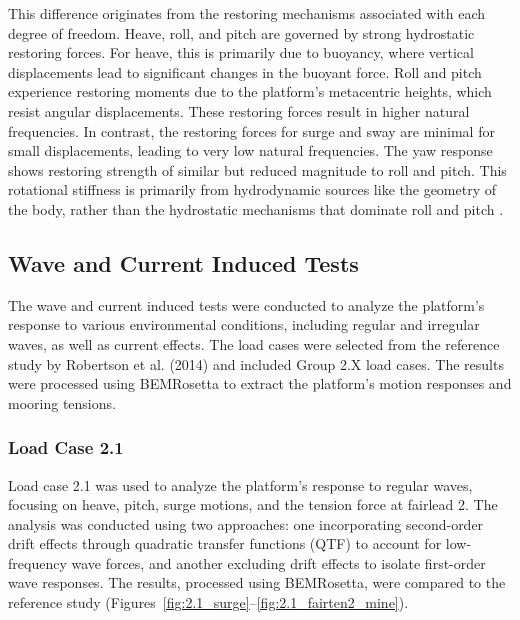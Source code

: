 \documentclass[a4paper, 11pt]{article}
\begin{document}
This difference originates from the restoring mechanisms associated with each degree of freedom. Heave, roll, and pitch are governed by strong hydrostatic restoring forces. For heave, this is primarily due to buoyancy, where vertical displacements lead to significant changes in the buoyant force. Roll and pitch experience restoring moments due to the platform's metacentric heights, which resist angular displacements. These restoring forces result in higher natural frequencies. In contrast, the restoring forces for surge and sway are minimal for small displacements, leading to very low natural frequencies. The yaw response shows restoring strength of similar but reduced magnitude to roll and pitch. This rotational stiffness is primarily from hydrodynamic sources like the geometry of the body, rather than the hydrostatic mechanisms that dominate roll and pitch \cite{metacenter}.


\subsection{Wave and Current Induced Tests}
\hspace*{0.5cm}The wave and current induced tests were conducted to analyze the platform's response to various environmental conditions, including regular and irregular waves, as well as current effects. The load cases were selected from the reference study by Robertson et al. (2014) and included Group 2.X load cases. The results were processed using BEMRosetta to extract the platform's motion responses and mooring tensions.

\subsubsection{Load Case 2.1}

\hspace{0.5cm}Load case 2.1 was used to analyze the platform’s response to regular waves, focusing on heave, pitch, surge motions, and the tension force at fairlead 2. The analysis was conducted using two approaches: one incorporating second-order drift effects through quadratic transfer functions (QTF) to account for low-frequency wave forces, and another excluding drift effects to isolate first-order wave responses. The results, processed using BEMRosetta, were compared to the reference study (Figures~\ref{fig:2.1_surge}--\ref{fig:2.1_fairten2_mine}).
\end{document}

